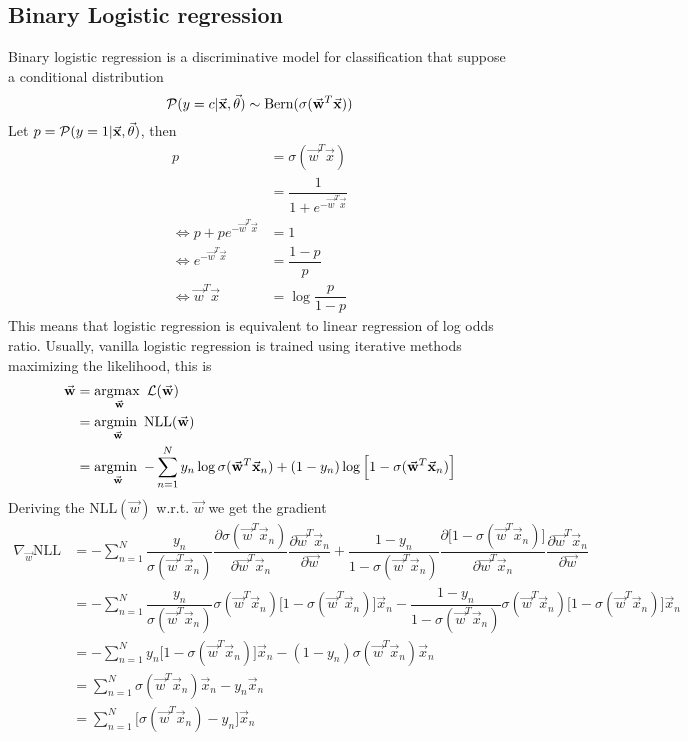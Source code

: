 \documentclass[../../main.tex]{subfiles}
\begin{document}
\subsection{Binary Logistic regression}
Binary logistic regression is a discriminative model for classification that suppose a conditional distribution
\begin{equation*}
    \p(y=c|\vec{x},\vec{\theta}) \sim \text{Bern}(\sigma(\vec{w}^T \vec{x}))
\end{equation*}
Let $p=\p(y=1|\vec{x},\vec{\theta})$, then
\begin{align*}
    p &= \sigma(\vec{w}^T \vec{x})\\
    &= \dfrac{1}{1 + e^{-\vec{w}^T \vec{x}}}\\
    \Longleftrightarrow 
    p + pe^{-\vec{w}^T \vec{x}} &= 1\\
    \Longleftrightarrow 
    e^{-\vec{w}^T \vec{x}} &= \dfrac{1 - p}{p}\\
    \Longleftrightarrow 
    \vec{w}^T \vec{x} &= \log\dfrac{p}{1 - p}    
\end{align*}
This means that logistic regression is equivalent to linear regression of log odds ratio. Usually, vanilla logistic regression is trained using iterative methods maximizing the likelihood, this is
\begin{align*}
    \vec{w} &= \argmax_{\vec{w}} \mathcal{L}(\vec{w})\\
    &= \argmin_{\vec{w}} \text{NLL}(\vec{w})\\
    &= \argmin_{\vec{w}} -\sum_{n=1}^N y_n\log\sigma(\vec{w}^T\vec{x}_n) +  (1-y_n)\log\Big[1-\sigma(\vec{w}^T\vec{x}_n)\Big]
\end{align*}
Deriving the $\text{NLL}(\vec{w})$ w.r.t. $\vec{w}$ we get the gradient
\begin{align*}
    \nabla_{\vec{w}} \text{NLL} 
    &= -\sum_{n=1}^N 
    \dfrac{y_n}{\sigma(\vec{w}^T\vec{x}_n)}
    \dfrac{\partial\sigma(\vec{w}^T\vec{x}_n)}{\partial\vec{w}^T\vec{x}_n}
    \dfrac{\partial\vec{w}^T\vec{x}_n}{\partial\vec{w}} 
    +
    \dfrac{1-y_n}{1-\sigma(\vec{w}^T\vec{x}_n)}
    \dfrac{\partial\Big[1-\sigma(\vec{w}^T\vec{x}_n)\Big]}{\partial\vec{w}^T\vec{x}_n} \dfrac{\partial\vec{w}^T\vec{x}_n}{\partial\vec{w}}\\
    &= -\sum_{n=1}^N 
    \dfrac{y_n}{\sigma(\vec{w}^T\vec{x}_n)}
    \sigma(\vec{w}^T\vec{x}_n)\Big[1-\sigma(\vec{w}^T\vec{x}_n)\Big]\vec{x}_n
    -
    \dfrac{1-y_n}{1-\sigma(\vec{w}^T\vec{x}_n)}
    \sigma(\vec{w}^T\vec{x}_n)\Big[1-\sigma(\vec{w}^T\vec{x}_n)\Big]\vec{x}_n\\
    &= -\sum_{n=1}^N 
    y_n\Big[1-\sigma(\vec{w}^T\vec{x}_n)\Big]\vec{x}_n
    -
    (1-y_n)
    \sigma(\vec{w}^T\vec{x}_n)\vec{x}_n\\
    &= \sum_{n=1}^N 
    \sigma(\vec{w}^T\vec{x}_n)\vec{x}_n
    -y_n\vec{x}_n\\
    &= \sum_{n=1}^N 
    \Big[\sigma(\vec{w}^T\vec{x}_n)-y_n\Big]\vec{x}_n\\
\end{align*}
\end{document}
